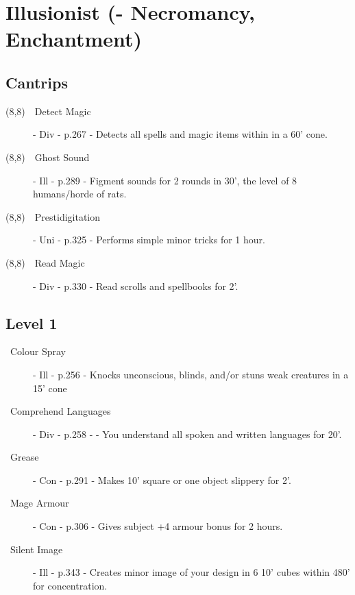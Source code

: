 \documentclass[10pt,a4paper,oneside]{article}
\begin{document}
\newcommand{\smallbox}{\framebox(8,8){}}
\newcommand{\boxitem}[3]{\item[\smallbox~~#1] - #2 - p.#3 - }
\newcommand{\nboxitem}[4]{\item[\Repeat{#1}{\smallbox~}~#2] - #3 - p.#4 - }

\section*{Illusionist (- Necromancy, Enchantment)}

\subsection*{Cantrips}

\begin{description}
  \boxitem{Detect Magic}{Div}{267} Detects all spells and magic items within in a 60' cone. 
  \boxitem{Ghost Sound}{Ill}{289} Figment sounds for 2 rounds in 30', the level of 8 humans/horde of rats.
  \boxitem{Prestidigitation}{Uni}{325} Performs simple minor tricks for 1 hour.
  \boxitem{Read Magic}{Div}{330} Read scrolls and spellbooks for 2'.
\end{description}

\subsection*{Level 1}

\begin{description}
  \nboxitem{4}{Colour Spray}{Ill}{256} Knocks unconscious, blinds, and/or stuns weak creatures in a 15' cone
  \nboxitem{3}{Comprehend Languages}{Div}{258} - You understand all spoken and written languages for 20'.
  \nboxitem{3}{Grease}{Con}{291} Makes 10' square or one object slippery for 2'.
  \nboxitem{3}{Mage Armour}{Con}{306} Gives subject +4 armour bonus for 2 hours.
  \nboxitem{4}{Silent Image}{Ill}{343} Creates minor image of your design in 6 10' cubes within 480' for concentration.
\end{description}
\end{document}
